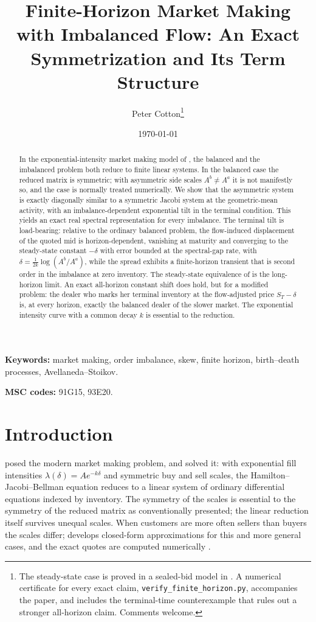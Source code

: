 \documentclass[11pt]{article}
\title{\textbf{Finite-Horizon Market Making with Imbalanced Flow: An Exact Symmetrization and Its Term Structure}}
\author{Peter Cotton\thanks{The steady-state case is proved in a sealed-bid model in \citet{cotton2026skew}. A numerical certificate for every exact claim, \texttt{verify\_finite\_horizon.py}, accompanies the paper, and includes the terminal-time counterexample that rules out a stronger all-horizon claim. Comments welcome.}}
\date{\today}
\begin{document}
\maketitle

\begin{abstract}
In the exponential-intensity market making model of \citet{glft2012}, the balanced and the imbalanced problem both reduce to finite linear systems. In the balanced case the reduced matrix is symmetric; with asymmetric side scales $A^b \neq A^a$ it is not manifestly so, and the case is normally treated numerically. We show that the asymmetric system is exactly diagonally similar to a symmetric Jacobi system at the geometric-mean activity, with an imbalance-dependent exponential tilt in the terminal condition. This yields an exact real spectral representation for every imbalance. The terminal tilt is load-bearing: relative to the ordinary balanced problem, the flow-induced displacement of the quoted mid is horizon-dependent, vanishing at maturity and converging to the steady-state constant $-\delta$ with error bounded at the spectral-gap rate, with $\delta = \tfrac{1}{2k}\log(A^b/A^a)$, while the spread exhibits a finite-horizon transient that is second order in the imbalance at zero inventory. The steady-state equivalence of \citet{cotton2026skew} is the long-horizon limit. An exact all-horizon constant shift does hold, but for a modified problem: the dealer who marks her terminal inventory at the flow-adjusted price $S_T - \delta$ is, at every horizon, exactly the balanced dealer of the slower market. The exponential intensity curve with a common decay $k$ is essential to the reduction.
\end{abstract}

\medskip
\noindent\textbf{Keywords:} market making, order imbalance, skew, finite horizon, birth--death processes, Avellaneda--Stoikov.

\noindent\textbf{MSC codes:} 91G15, 93E20.

\section{Introduction}

\citet{avellaneda2008} posed the modern market making problem, and \citet{glft2012} solved it: with exponential fill intensities $\lambda(\delta) = A e^{-k\delta}$ and symmetric buy and sell scales, the Hamilton--Jacobi--Bellman equation reduces to a linear system of ordinary differential equations indexed by inventory. The symmetry of the scales is essential to the symmetry of the reduced matrix as conventionally presented; the linear reduction itself survives unequal scales. When customers are more often sellers than buyers the scales differ; \citet{gueant2017} develops closed-form approximations for this and more general cases, and the exact quotes are computed numerically \citep{gueant2017,bergaultgueant2021}.
\end{document}
